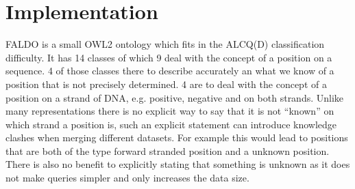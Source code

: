 \section*{Implementation}

FALDO is a small OWL2 ontology which fits in the ALCQ(D) classification difficulty.
It has 14 classes of which 9 deal with the concept of a position on a sequence. 
4 of those classes there to describe accurately an what we know of a position that is not precisely determined. 
4 are to deal with the concept of a position on a strand of DNA, e.g. positive, negative and on both strands.
Unlike many representations there is no explicit way to say that it is not ``known'' on which strand a position is,
such an explicit statement can introduce knowledge clashes when merging different datasets.
For example this would lead to positions that are both of the type forward stranded position and a unknown position.
There is also no benefit to explicitly stating that something is unknown as it does not make queries simpler and 
only increases the data size.


